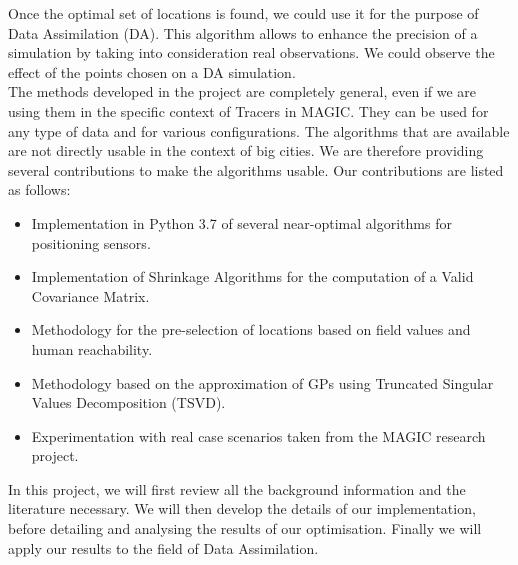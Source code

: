 Once the optimal set of locations is found, we could use it for the purpose of Data Assimilation (DA). This algorithm allows to enhance the precision of a simulation by taking into consideration real observations. We could observe the effect of the points chosen on a DA simulation. \\


The methods developed in the project are completely general, even if we are using them in the specific context of Tracers in MAGIC. They can be used for any type of  data and for various configurations. The algorithms that are available are not directly usable in the context of big cities. We are therefore providing several contributions to make the algorithms usable. Our contributions are listed as follows:
\begin{itemize}
	\item Implementation in Python 3.7 of several near-optimal algorithms for positioning sensors. 
	\item Implementation of Shrinkage Algorithms for the computation of a Valid Covariance Matrix. 
	\item Methodology for the pre-selection of locations based on field values and human reachability. 
	\item Methodology based on the approximation of GPs using Truncated Singular Values Decomposition (TSVD). 
	\item Experimentation with real case scenarios taken from the MAGIC research project. 
\end{itemize}


In this project, we will first review all the background information and the literature necessary. We will then develop the details of our implementation, before detailing and analysing the results of our optimisation. Finally we will apply our results to the field of Data Assimilation. 














 